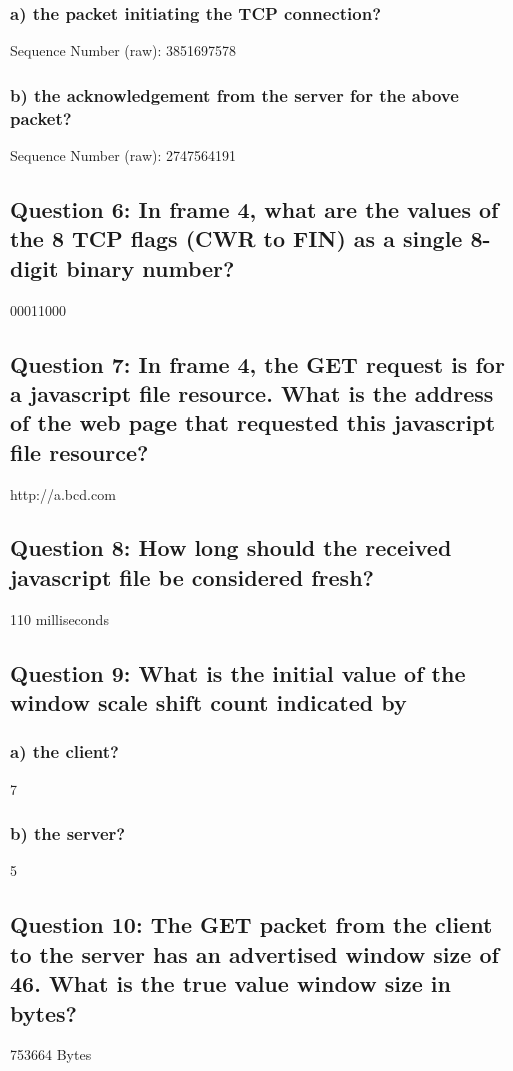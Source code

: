 \documentclass[11pt, oneside, a4paper]{article}
\begin{document}
  \subsubsection*{a) the packet initiating the TCP connection?}
  Sequence Number (raw): 3851697578
  \subsubsection*{b) the acknowledgement from the server for the above packet?}
  Sequence Number (raw): 2747564191

\subsection*{Question 6: In frame 4, what are the values of the 8 TCP flags (CWR to FIN) as a single 8-digit binary number?}
00011000

\subsection*{Question 7: In frame 4, the GET request is for a javascript file resource. What is the address of the web page that requested this javascript file resource?}
http://a.bcd.com

\subsection*{Question 8: How long should the received javascript file be considered fresh?}
110 milliseconds

\subsection*{Question 9: What is the initial value of the window scale shift count indicated by}
    \subsubsection*{a) the client?}
    7

    \subsubsection*{b) the server?}
    5

\subsection*{Question 10: The GET packet from the client to the server has an advertised window size of 46. What is the true value window size in bytes?}
753664 Bytes
\end{document}
